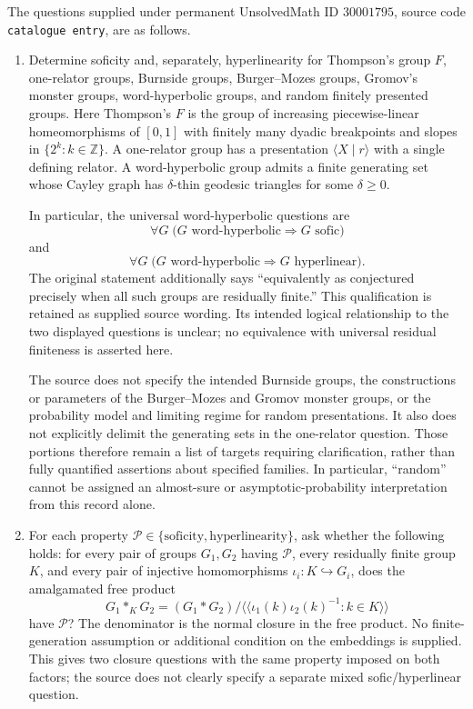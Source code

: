 \documentclass[11pt]{article}
\newcommand{\Z}{\mathbb{Z}}
\begin{document}
The questions supplied under permanent UnsolvedMath ID \(30001795\), source code \texttt{catalogue entry}, are as follows.
\begin{enumerate}
\item Determine soficity and, separately, hyperlinearity for Thompson's group \(F\), one-relator groups, Burnside groups, Burger--Mozes groups, Gromov's monster groups, word-hyperbolic groups, and random finitely presented groups. Here Thompson's \(F\) is the group of increasing piecewise-linear homeomorphisms of \([0,1]\) with finitely many dyadic breakpoints and slopes in \(\{2^k:k\in\Z\}\). A one-relator group has a presentation \(\langle X\mid r\rangle\) with a single defining relator. A word-hyperbolic group admits a finite generating set whose Cayley graph has \(\delta\)-thin geodesic triangles for some \(\delta\geq0\).

In particular, the universal word-hyperbolic questions are
\[
 \forall G\;\bigl(G\text{ word-hyperbolic}\Longrightarrow G\text{ sofic}\bigr)
\]
and
\[
 \forall G\;\bigl(G\text{ word-hyperbolic}\Longrightarrow G\text{ hyperlinear}\bigr).
\]
The original statement additionally says ``equivalently as conjectured precisely when all such groups are residually finite.'' This qualification is retained as supplied source wording. Its intended logical relationship to the two displayed questions is unclear; no equivalence with universal residual finiteness is asserted here.

The source does not specify the intended Burnside groups, the constructions or parameters of the Burger--Mozes and Gromov monster groups, or the probability model and limiting regime for random presentations. It also does not explicitly delimit the generating sets in the one-relator question. Those portions therefore remain a list of targets requiring clarification, rather than fully quantified assertions about specified families. In particular, ``random'' cannot be assigned an almost-sure or asymptotic-probability interpretation from this record alone.

\item For each property \(\mathcal P\in\{\text{soficity},\text{hyperlinearity}\}\), ask whether the following holds: for every pair of groups \(G_1,G_2\) having \(\mathcal P\), every residually finite group \(K\), and every pair of injective homomorphisms \(\iota_i:K\hookrightarrow G_i\), does the amalgamated free product
\[
 G_1*_{K}G_2
 = (G_1*G_2)\big/\big\langle\!\big\langle
 \iota_1(k)\iota_2(k)^{-1}:k\in K
 \big\rangle\!\big\rangle
\]
have \(\mathcal P\)? The denominator is the normal closure in the free product. No finite-generation assumption or additional condition on the embeddings is supplied. This gives two closure questions with the same property imposed on both factors; the source does not clearly specify a separate mixed sofic/hyperlinear question.


\end{enumerate}
\end{document}
